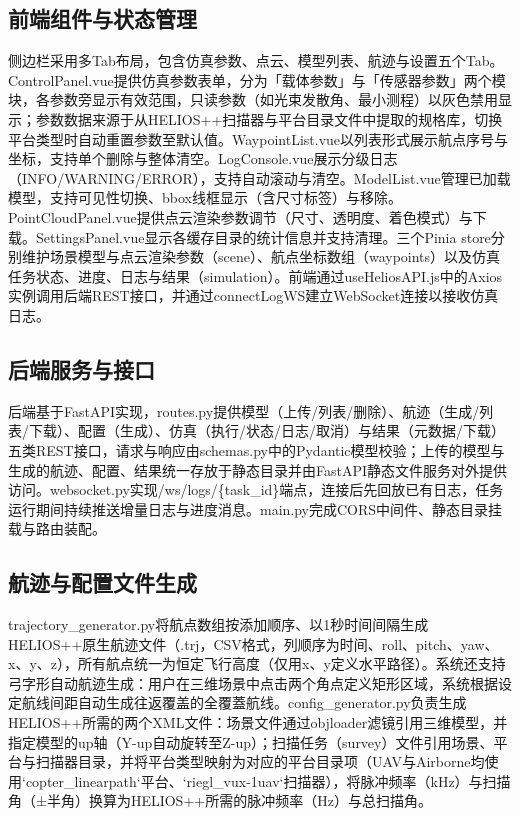 \documentclass[a4paper,fleqn]{cas-sc}
\begin{document}
\subsection{前端组件与状态管理}
侧边栏采用多Tab布局，包含仿真参数、点云、模型列表、航迹与设置五个Tab。ControlPanel.vue提供仿真参数表单，分为「载体参数」与「传感器参数」两个模块，各参数旁显示有效范围，只读参数（如光束发散角、最小测程）以灰色禁用显示；参数数据来源于从HELIOS++扫描器与平台目录文件中提取的规格库，切换平台类型时自动重置参数至默认值。WaypointList.vue以列表形式展示航点序号与坐标，支持单个删除与整体清空。LogConsole.vue展示分级日志（INFO/WARNING/ERROR），支持自动滚动与清空。ModelList.vue管理已加载模型，支持可见性切换、bbox线框显示（含尺寸标签）与移除。PointCloudPanel.vue提供点云渲染参数调节（尺寸、透明度、着色模式）与下载。SettingsPanel.vue显示各缓存目录的统计信息并支持清理。三个Pinia store分别维护场景模型与点云渲染参数（scene）、航点坐标数组（waypoints）以及仿真任务状态、进度、日志与结果（simulation）。前端通过useHeliosAPI.js中的Axios实例调用后端REST接口，并通过connectLogWS建立WebSocket连接以接收仿真日志。

\subsection{后端服务与接口}
后端基于FastAPI实现，routes.py提供模型（上传/列表/删除）、航迹（生成/列表/下载）、配置（生成）、仿真（执行/状态/日志/取消）与结果（元数据/下载）五类REST接口，请求与响应由schemas.py中的Pydantic模型校验；上传的模型与生成的航迹、配置、结果统一存放于静态目录并由FastAPI静态文件服务对外提供访问。websocket.py实现/ws/logs/\{task\_id\}端点，连接后先回放已有日志，任务运行期间持续推送增量日志与进度消息。main.py完成CORS中间件、静态目录挂载与路由装配。

\subsection{航迹与配置文件生成}
trajectory\_generator.py将航点数组按添加顺序、以1秒时间间隔生成HELIOS++原生航迹文件（.trj，CSV格式，列顺序为时间、roll、pitch、yaw、x、y、z），所有航点统一为恒定飞行高度（仅用x、y定义水平路径）。系统还支持弓字形自动航迹生成：用户在三维场景中点击两个角点定义矩形区域，系统根据设定航线间距自动生成往返覆盖的全覆蓋航线。config\_generator.py负责生成HELIOS++所需的两个XML文件：场景文件通过objloader滤镜引用三维模型，并指定模型的up轴（Y-up自动旋转至Z-up）；扫描任务（survey）文件引用场景、平台与扫描器目录，并将平台类型映射为对应的平台目录项（UAV与Airborne均使用`copter\_linearpath`平台、`riegl\_vux-1uav`扫描器），将脉冲频率（kHz）与扫描角（±半角）换算为HELIOS++所需的脉冲频率（Hz）与总扫描角。
\end{document}
